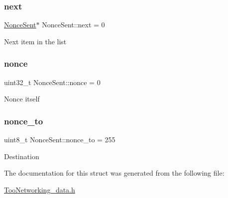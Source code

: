 \subsubsection{\texorpdfstring{next}{next}}
{\footnotesize\ttfamily \hyperlink{structNonceSent}{Nonce\+Sent}$\ast$ Nonce\+Sent\+::next = 0}

Next item in the list \mbox{\label{structNonceSent_ae9d167a911c22c9d4490d2fee2093c10}} 
\subsubsection{\texorpdfstring{nonce}{nonce}}
{\footnotesize\ttfamily uint32\+\_\+t Nonce\+Sent\+::nonce = 0}

Nonce itself \mbox{\label{structNonceSent_ad5484888a11a0c041610c38b564c5627}} 
\subsubsection{\texorpdfstring{nonce\+\_\+to}{nonce\_to}}
{\footnotesize\ttfamily uint8\+\_\+t Nonce\+Sent\+::nonce\+\_\+to = 255}

Destination 

The documentation for this struct was generated from the following file\+:\begin{DoxyCompactItemize}
\item 
\hyperlink{TooNetworking__data_8h}{Too\+Networking\+\_\+data.\+h}\end{DoxyCompactItemize}
